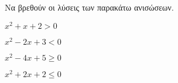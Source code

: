 Να βρεθούν οι λύσεις των παρακάτω ανισώσεων.
\begin{multicols}{2}
\begin{alist}
\item $ x^2+x+2>0 $
\item $ x^2-2x+3<0 $
\item $ x^2-4x+5\geq0 $
\item $ x^2+2x+2\leq0 $
\end{alist}
\end{multicols}
